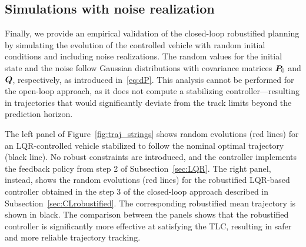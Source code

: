 \subsection{Simulations with noise realization}
Finally, we provide an empirical validation of the closed-loop robustified planning by simulating the evolution of the controlled vehicle with random initial conditions and including noise realizations. The random values for the initial state and the noise follow Gaussian distributions with covariance matrices $\boldsymbol{P}_0$ and $\boldsymbol{Q}$, respectively, as introduced in~\eqref{eq:dP}. This analysis cannot be performed for the open-loop approach, as it does not compute a stabilizing controller---resulting in trajectories that would significantly deviate from the track limits beyond the prediction horizon.

The left panel of Figure~\ref{fig:traj_strings} shows random evolutions (red lines) for an LQR-controlled vehicle stabilized to follow the nominal optimal trajectory (black line). No robust constraints are introduced, and the controller implements the feedback policy from step 2 of Subsection~\ref{sec:LQR}. The right panel, instead, shows the random evolutions (red lines) for the robustified LQR-based controller obtained in the step 3 of the closed-loop approach described in Subsection~\ref{sec:CLrobustified}. The corresponding robustified mean trajectory is shown in black.
The comparison between the panels shows that the robustified controller is significantly more effective at satisfying the TLC, resulting in safer and more reliable trajectory tracking.



